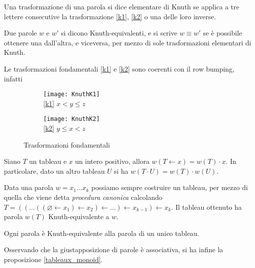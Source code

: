 \begin{defn}
Una trasformazione di una parola si dice elementare di Knuth se
applica a tre lettere consecutive la trasformazione \eqref{k1},
\eqref{k2} o una delle loro inverse.
\end{defn}

\begin{defn}
Due parole $w$ e $w'$ si dicono Knuth-equivalenti, e si scrive $w
\equiv w'$ se \`e possibile ottenere una dall'altra, e viceversa, per
mezzo di sole trasformazioni elementari di Knuth.
\end{defn}
\begin{oss}
Le trasformazioni fondamentali \eqref{k1} e \eqref{k2} sono coerenti
con il row bumping, infatti

\begin{figure}[h]
\centering

\begin{subfigure}[b]{0.3\textwidth}
\centering
\texttt{[image: KnuthK1]}\\
\eqref{k1} $x < y \leq z$
\end{subfigure}%
\begin{subfigure}[b]{0.3\textwidth}
\centering
\texttt{[image: KnuthK2]}\\
\eqref{k2} $y \leq x < z$
\end{subfigure}

\caption{Trasformazioni fondamentali}
\end{figure}
\end{oss}

\begin{prop}\label{word_bump_equiv}
Siano $T$ un tableau e $x$ un intero positivo, allora $w(T \gets x) = w(T)
\cdot x$. In particolare, dato un altro tableau $U$ si ha $w(T\cdot U)
= w(T) \cdot w(U)$.
\end{prop}

Data una parola $w = x_1 \ldots x_k$ possiamo sempre costruire un
tableau, per mezzo di quella che viene detta \emph{procedura canonica}
calcolando $T = (( \ldots ((\varnothing \gets x_1) \gets x_2 ) \gets \ldots ) \gets x_{k-1} )
\gets x_k$. Il tableau ottenuto ha parola $w(T)$ Knuth-equivalente a
$w$.

\begin{teo}\label{knuth_equiv_word}
Ogni parola \`e Knuth-equivalente alla parola di un unico tableau.
\end{teo}

Osservando che la giustapposizione di parole \`e associativa, si ha
infine la proposizione \ref{tableaux_monoid}.
